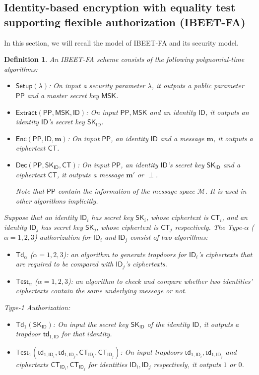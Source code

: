 \documentclass[runningheads,10pt]{llncs}
\newtheorem{defn}[thm]{Definition}
\def\cal{\mathcal}
\def\bf{\mathbf}
\def\SK{\mathsf{SK}}
\def\PP{\mathsf{PP}}
\def\MSK{\mathsf{MSK}}
\def\CT{\mathsf{CT}}
\def\td{\mathsf{td}}
\def\Setup{\mathsf{Setup}}
\def\Enc{\mathsf{Enc}}
\def\Extract{\mathsf{Extract}}
\def\Dec{\mathsf{Dec}}
\def\Td{\mathsf{Td}}
\def\Test{\mathsf{Test}}
\def\ID{\mathsf{ID}}
\begin{document}
\subsection{Identity-based encryption with equality test supporting flexible authorization (IBEET-FA)}
In this section, we will recall the model of IBEET-FA and its security model.
\begin{defn}\label{def:PKEET-FA}
	An IBEET-FA scheme consists of the following polynomial-time algorithms:
	\begin{itemize}
		\item $\Setup(\lambda)$: On input a security parameter $\lambda$, it outputs a public parameter $\PP$ and a master secret key $\MSK$.
		\item $\Extract(\PP,\MSK,\ID)$: On input $\PP, \MSK$ and an identity $\ID$, it outputs an identity $\ID$'s secret key $\SK_{\ID}$.
		\item $\Enc(\PP,\ID,\bf{m})$: On input  $\PP$, an identity $\ID$ and a message $\bf{m}$, it outputs a ciphertext $\CT$.
		\item $\Dec(\PP,\SK_{\ID},\CT)$: On input $\PP$, an identity $\ID$'s secret key $\SK_\ID$ and a ciphertext $\CT$, it outputs a message $\bf{m}'$ or $\perp$.
		
		Note that $\PP$ contain the information of the message space $\cal{M}$. It is used in other algorithms implicitly.
	\end{itemize}  
	
	Suppose that an identity $\ID_{i}$ has secret key $\SK_{i}$, whose ciphertext is $\CT_{i}$, and an identity $\ID_{j}$ has secret key $\SK_{j}$, whose ciphertext is $\CT_{j}$ respectively. The Type-$\alpha$ ($\alpha = 1, 2, 3$) authorization for $\ID_{i}$ and $\ID_{j}$ consist of two algorithms:
	\begin{itemize}
		\item[$\bullet$] $\Td_{\alpha}$ ($\alpha = 1, 2, 3$): an algorithm to generate trapdoors for $\ID_{i}$’s ciphertexts that are required to be compared with $\ID_{j}$’s ciphertexts.
		\item[$\bullet$] $\Test_{\alpha}$ ($\alpha = 1, 2, 3$): an algorithm to check and compare whether two identities’ ciphertexts contain the same underlying message or not.
	\end{itemize}
	
	Type-1 Authorization:
	\begin{itemize}
		\item[$\bullet$] $\Td_1(\SK_{\ID})$: On input the secret key $\SK_{\ID}$ of the identity $\ID$, it outputs a trapdoor $\td_{1,\ID}$ for that identity.
		\item[$\bullet$] $\Test_1(\td_{1,\ID_i},\td_{1,\ID_j},\CT_{\ID_i},\CT_{\ID_j})$: On input trapdoors $\td_{1,\ID_i}, \td_{1,\ID_j}$ and ciphertexts $\CT_{\ID_i}, \CT_{\ID_j}$ for identities $\ID_i, \ID_j$ respectively, it outputs $1$ or $0$.
	\end{itemize}
	

\end{defn}
\end{document}
